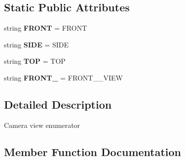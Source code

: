 \subsection*{Static Public Attributes}
\begin{DoxyCompactItemize}
\item 
string {\bfseries F\+R\+O\+NT} = \textquotesingle{}F\+R\+O\+NT\textquotesingle{}\hypertarget{classmeshy_1_1neuromorphovis_1_1enums_1_1camera__enums_1_1Camera_1_1View_a3b7621342bb2dcae7734ef7a739b81da}{}\label{classmeshy_1_1neuromorphovis_1_1enums_1_1camera__enums_1_1Camera_1_1View_a3b7621342bb2dcae7734ef7a739b81da}

\item 
string {\bfseries S\+I\+DE} = \textquotesingle{}S\+I\+DE\textquotesingle{}\hypertarget{classmeshy_1_1neuromorphovis_1_1enums_1_1camera__enums_1_1Camera_1_1View_a63c010386174e880009490197fb90936}{}\label{classmeshy_1_1neuromorphovis_1_1enums_1_1camera__enums_1_1Camera_1_1View_a63c010386174e880009490197fb90936}

\item 
string {\bfseries T\+OP} = \textquotesingle{}T\+OP\textquotesingle{}\hypertarget{classmeshy_1_1neuromorphovis_1_1enums_1_1camera__enums_1_1Camera_1_1View_a0effaac8c9a1a4a02c4fc07da4fd743c}{}\label{classmeshy_1_1neuromorphovis_1_1enums_1_1camera__enums_1_1Camera_1_1View_a0effaac8c9a1a4a02c4fc07da4fd743c}

\item 
string {\bfseries F\+R\+O\+N\+T\+\_} = \textquotesingle{}F\+R\+O\+N\+T\+\_\+\_\+\+V\+I\+EW\textquotesingle{}\hypertarget{classmeshy_1_1neuromorphovis_1_1enums_1_1camera__enums_1_1Camera_1_1View_ad3c341f36c798b33c5cc4537928fb51b}{}\label{classmeshy_1_1neuromorphovis_1_1enums_1_1camera__enums_1_1Camera_1_1View_ad3c341f36c798b33c5cc4537928fb51b}

\end{DoxyCompactItemize}


\subsection{Detailed Description}


\begin{DoxyVerb}Camera view enumerator
\end{DoxyVerb}
 

\subsection{Member Function Documentation}
